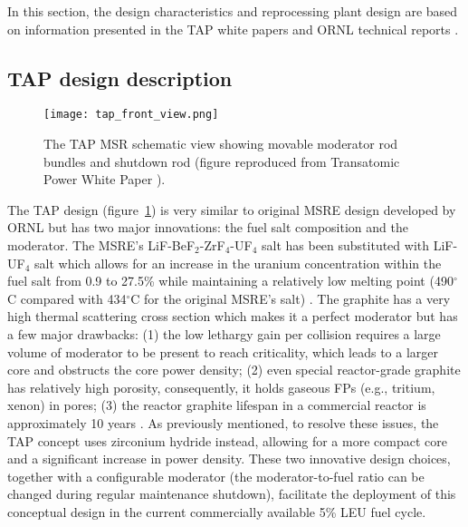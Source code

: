 In this section, the design characteristics and reprocessing plant design are 
based on
information presented in the TAP white papers  
\cite{transatomic_power_corporation_technical_2016, 
transatomic_power_corporation_neutronics_2016} and \gls{ORNL} technical 
reports \cite{betzler_two-dimensional_2017, betzler_assessment_2017}.

\subsection{TAP design description}
\begin{figure}[h] %
	  		\hspace{+2.2in}
	\texttt{[image: tap\_front\_view.png]}
	\caption{The \gls{TAP} \gls{MSR} schematic view showing movable moderator 
		rod 
		bundles and shutdown rod (figure reproduced from Transatomic Power 
		White Paper 
		\cite{transatomic_power_corporation_technical_2016}).}
	\label{fig:tap-main-view}
\end{figure}
The \gls{TAP} design (figure~\ref{fig:tap-main-view}) is very similar to 
original \gls{MSRE} design developed by \gls{ORNL} 
\cite{haubenreich_experience_1970} but has two major innovations: 
the fuel salt composition and the moderator. The \gls{MSRE}'s 
LiF-BeF$_2$-ZrF$_4$-UF$_4$ salt has been substituted with LiF-UF$_4$ salt 
which allows for an increase in the uranium concentration within the fuel salt 
from 0.9 to 27.5\% while maintaining a relatively low melting point 
(490$^{\circ}$C compared with 434$^{\circ}$C for the original \gls{MSRE}'s 
salt) \cite{betzler_two-dimensional_2017}. The graphite has a very high 
thermal scattering cross section which makes it a perfect moderator but has 
a few major drawbacks: 
(1) the low lethargy gain per collision requires a large volume of moderator 
to be present to reach criticality, which leads to a larger core and obstructs 
the core power density; (2) even special 
reactor-grade graphite has relatively high porosity, consequently, it holds
gaseous \glspl{FP} 
(e.g., tritium, xenon) in pores; (3) the reactor graphite lifespan in a 
commercial 
reactor is approximately 10 years \cite{robertson_conceptual_1971}. As previously 
mentioned, to resolve these issues, the \gls{TAP} concept uses zirconium 
hydride instead, allowing for a more compact core and a significant increase 
in power density. These two innovative design choices, together with a 
configurable moderator (the moderator-to-fuel ratio can be changed during 
regular maintenance shutdown), facilitate the deployment of this conceptual 
design in the current commercially available 5\% \gls{LEU} fuel cycle. 

